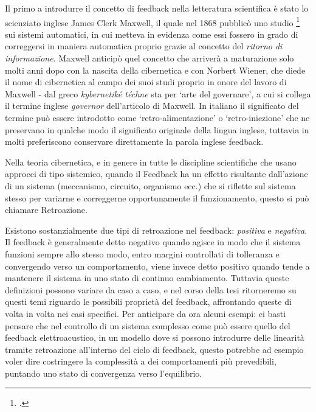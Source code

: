 Il primo a introdurre il concetto di feedback nella letteratura scientifica 
è stato lo scienziato inglese James Clerk Maxwell, 
il quale nel 1868 pubblicò uno studio \footcite{maxwellongovernor}
sui sistemi automatici, in cui metteva in evidenza come essi fossero in grado di correggersi
in maniera automatica proprio grazie al concetto del \textit{ritorno di informazione}.
Maxwell anticipò quel concetto che arriverà a maturazione solo molti anni dopo con 
la nascita della cibernetica e con Norbert Wiener, 
che diede il nome di cibernetica al campo dei suoi studi proprio in onore del lavoro di Maxwell 
- dal greco \textit{kybernetiké téchne} sta per ‘arte del governare’, 
a cui si collega il termine inglese \textit{governor} dell'articolo di Maxwell.
In italiano il significato del termine può essere introdotto come ‘retro-alimentazione’
o ‘retro-iniezione’ che ne preservano in qualche modo il significato originale della lingua inglese,
tuttavia in molti preferiscono conservare direttamente la parola inglese feedback. 

Nella teoria cibernetica, e in genere in tutte le discipline scientifiche che usano approcci di tipo sistemico, 
quando il Feedback ha un effetto risultante dall’azione di un sistema (meccanismo, circuito, organismo ecc.) 
che si riflette sul sistema stesso per variarne e correggerne opportunamente il funzionamento, 
questo si può chiamare Retroazione. 

Esistono sostanzialmente due tipi di retroazione nel feedback: \textit{positiva} e \textit{negativa}.
Il feedback è generalmente detto negativo quando agisce in modo che il sistema funzioni sempre allo stesso modo, 
entro margini controllati di tolleranza e convergendo verso un comportamento, 
viene invece detto positivo quando tende a mantenere il sistema in uno stato di continuo cambiamento.
Tuttavia queste definizioni possono variare da caso a caso, 
e nel corso della tesi ritorneremo su questi temi
riguardo le possibili proprietà del feedback, affrontando queste di volta in volta
nei casi specifici.
Per anticipare da ora alcuni esempi: 
ci basti pensare che nel controllo di un sistema complesso
come può essere quello del feedback elettroacustico,
in un modello dove si possono introdurre delle linearità 
tramite retroazione all'interno del ciclo di
feedback, questo potrebbe ad esempio voler dire costringere la complessità
a dei comportamenti più prevedibili, 
puntando uno stato di convergenza verso l'equilibrio. 

